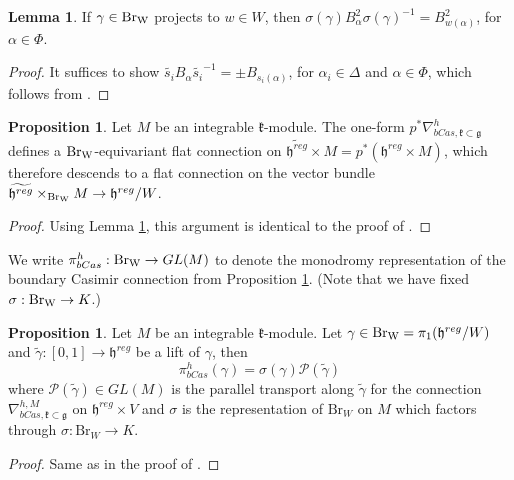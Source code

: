 \documentclass[10pt]{amsart}
\numberwithin{equation}{section}
\theoremstyle{definition}
\newtheorem{lemma}[theorem]{Lemma}
\newtheorem{proposition}[theorem]{Proposition}
\let\tilde=\widetilde
\newcommand{\Br}{\mathrm{Br}}
\DeclareMathOperator{\BrW}{{\rm Br}_{W}}
\newcommand{\g}{\mathfrak{g}}
\newcommand{\h}{\mathfrak{h}}
\newcommand{\kompact}{\mathfrak{k}}
\begin{document}
\begin{lemma}\label{lem:wBwinvers}
    If $\gamma\in \BrW$ projects to $w\in W$, then $\sigma(\gamma)B^2_{\alpha}\sigma(\gamma)^{-1} =  B^2_{w(\alpha)}$, for $\alpha \in \Phi$. 
\end{lemma}
\begin{proof}
    It suffices to show $\tilde{s_{i}}B_{\alpha}\tilde{s_{i}}^{-1} = \pm B_{s_{i}(\alpha)}$, for $\alpha_i \in \Delta$ and $\alpha \in \Phi$, which follows from \cite[Lemma 3.15]{MR4983792}.
\end{proof}

\begin{proposition}\label{prop:iCasconnectiondescends}
    Let $M$ be an integrable $\kompact$-module. The one-form $p^*\nabla_{bCas, \kompact\subset \g}^{h}$ defines a $\BrW$-equivariant flat connection on $\tilde{\h^{reg}}\times M=p^*(\h^{reg}\times M)$, which therefore descends to a flat connection on the vector bundle $\tilde{\h^{reg}}\times_{\BrW} M\rightarrow \h^{reg}/W$.
\end{proposition}

\begin{proof}
    Using Lemma \ref{lem:wBwinvers}, this argument is identical to the proof of \cite[Proposition 2.3]{Valerio-qWeyl}.
\end{proof}

We write $\pi^{h}_{bCas}:\BrW \rightarrow GL(M)$ to denote the monodromy representation of the boundary Casimir connection from Proposition \ref{prop:iCasconnectiondescends}. (Note that we have fixed $\sigma:\BrW \rightarrow K$.)

\begin{proposition}\label{parralel_transport}
    Let $M$ be an integrable $\kompact$-module. Let $\gamma\in \BrW=\pi_1(\mathfrak{h}^{reg}/W)$ and $\widetilde{\gamma}:[0,1]\rightarrow \mathfrak{h}^{reg}$ be a lift of $\gamma$, then
    \begin{equation}\label{monodromy_bCas_sigma}
        \pi^{h}_{bCas}(\gamma)=\sigma(\gamma)\mathcal{P}(\widetilde{\gamma})
    \end{equation}
    where $\mathcal{P}(\widetilde{\gamma})\in GL(M)$ is the parallel transport along $\widetilde{\gamma}$ for the connection $\nabla_{bCas,\kompact \subset \mathfrak{g}}^{h,M}$ on $\mathfrak{h}^{reg} \times V$ and $\sigma$ is the representation of $\Br_W$ on $M$ which factors through $\sigma:\Br_W\rightarrow K$.
\end{proposition}
\begin{proof}
    Same as in the proof of \cite[Proposition 2.4]{Valerio-qWeyl}.
\end{proof}
%
\end{document}
